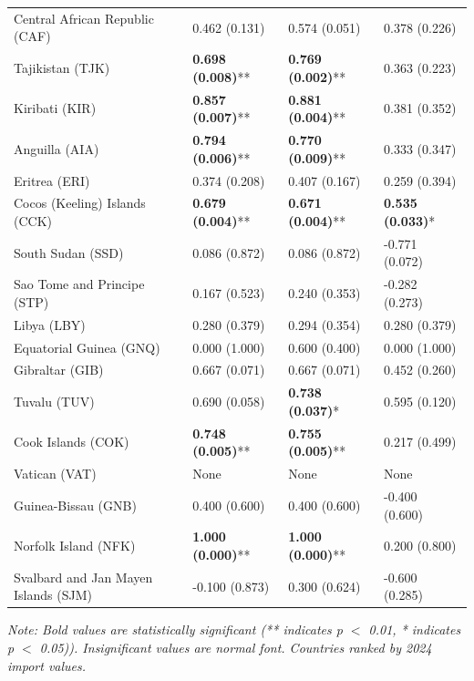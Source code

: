 \begin{longtable}{p{4cm}p{3cm}p{3cm}p{3cm}}
Central African Republic (CAF) & 0.462 (0.131) & 0.574 (0.051) & 0.378 (0.226) \\
Tajikistan (TJK) & \textbf{0.698 (0.008)}** & \textbf{0.769 (0.002)}** & 0.363 (0.223) \\
Kiribati (KIR) & \textbf{0.857 (0.007)}** & \textbf{0.881 (0.004)}** & 0.381 (0.352) \\
Anguilla (AIA) & \textbf{0.794 (0.006)}** & \textbf{0.770 (0.009)}** & 0.333 (0.347) \\
Eritrea (ERI) & 0.374 (0.208) & 0.407 (0.167) & 0.259 (0.394) \\
Cocos (Keeling) Islands (CCK) & \textbf{0.679 (0.004)}** & \textbf{0.671 (0.004)}** & \textbf{0.535 (0.033)}* \\
South Sudan (SSD) & 0.086 (0.872) & 0.086 (0.872) & -0.771 (0.072) \\
Sao Tome and Principe (STP) & 0.167 (0.523) & 0.240 (0.353) & -0.282 (0.273) \\
Libya (LBY) & 0.280 (0.379) & 0.294 (0.354) & 0.280 (0.379) \\
Equatorial Guinea (GNQ) & 0.000 (1.000) & 0.600 (0.400) & 0.000 (1.000) \\
Gibraltar (GIB) & 0.667 (0.071) & 0.667 (0.071) & 0.452 (0.260) \\
Tuvalu (TUV) & 0.690 (0.058) & \textbf{0.738 (0.037)}* & 0.595 (0.120) \\
Cook Islands (COK) & \textbf{0.748 (0.005)}** & \textbf{0.755 (0.005)}** & 0.217 (0.499) \\
Vatican (VAT) & None & None & None \\
Guinea-Bissau (GNB) & 0.400 (0.600) & 0.400 (0.600) & -0.400 (0.600) \\
Norfolk Island (NFK) & \textbf{1.000 (0.000)}** & \textbf{1.000 (0.000)}** & 0.200 (0.800) \\
Svalbard and Jan Mayen Islands (SJM) & -0.100 (0.873) & 0.300 (0.624) & -0.600 (0.285) \\
\end{longtable}

\textit{Note: Bold values are statistically significant (** indicates p $<$ 0.01, * indicates p $<$ 0.05)). Insignificant values are normal font. Countries ranked by 2024 import values.}